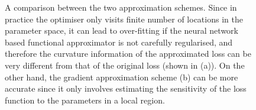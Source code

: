 \begin{figure}
\hfill
{}
\caption{A comparison between the two approximation schemes. Since in practice the optimiser only visits finite number of locations in the parameter space, it can lead to over-fitting if the neural network based functional approximator is not carefully regularised, and therefore the curvature information of the approximated loss can be very different from that of the original loss (shown in (a)). On the other hand, the gradient approximation scheme (b) can be more accurate since it only involves estimating the sensitivity of the loss function to the parameters in a local region.}
\label{fig:loss_grad_approx_compare}
\end{figure}

